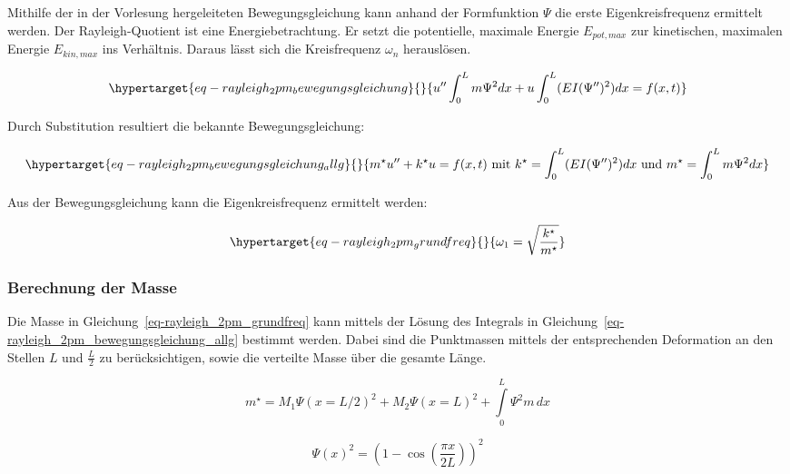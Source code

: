 \documentclass[
  letterpaper,
  DIV=11]{scrreprt}
\begin{document}
Mithilfe der in der Vorlesung hergeleiteten Bewegungsgleichung kann
anhand der Formfunktion \(\Psi\) die erste Eigenkreisfrequenz ermittelt
werden. Der Rayleigh-Quotient ist eine Energiebetrachtung. Er setzt die
potentielle, maximale Energie \(E_{pot,max}\) zur kinetischen, maximalen
Energie \(E_{kin,max}\) ins Verhältnis. Daraus lässt sich die
Kreisfrequenz \(\omega_n\) herauslösen.

\begin{equation}\protect\hypertarget{eq-rayleigh_2pm_bewegungsgleichung}{}{
u'' \int_0^L m\Psi^2 dx + u \int_0^L (EI(\Psi'')^2)dx = f(x,t)
}\label{eq-rayleigh_2pm_bewegungsgleichung}\end{equation}

Durch Substitution resultiert die bekannte Bewegungsgleichung:

\begin{equation}\protect\hypertarget{eq-rayleigh_2pm_bewegungsgleichung_allg}{}{
m^\star u'' + k^\star u  = f(x,t) 
\text{ mit } k^\star = \int_0^L (EI(\Psi'')^2)dx 
\text{ und } m^\star = \int_0^L m\Psi^2dx
}\label{eq-rayleigh_2pm_bewegungsgleichung_allg}\end{equation}

Aus der Bewegungsgleichung kann die Eigenkreisfrequenz ermittelt werden:

\begin{equation}\protect\hypertarget{eq-rayleigh_2pm_grundfreq}{}{
\omega_1 = \sqrt{\frac{k^\star}{m^\star}}
}\label{eq-rayleigh_2pm_grundfreq}\end{equation}

\hypertarget{berechnung-der-masse}{%
\subsubsection{Berechnung der Masse}\label{berechnung-der-masse}}

Die Masse in Gleichung~\ref{eq-rayleigh_2pm_grundfreq} kann mittels der
Lösung des Integrals in
Gleichung~\ref{eq-rayleigh_2pm_bewegungsgleichung_allg} bestimmt werden.
Dabei sind die Punktmassen mittels der entsprechenden Deformation an den
Stellen \(L\) und \(\frac{L}{2}\) zu berücksichtigen, sowie die
verteilte Masse über die gesamte Länge.

\begin{equation}m^{\star} = M_{1} \Psi(x=L/2)^{2} + M_{2} \Psi(x=L)^{2} + \int\limits_{0}^{L} \Psi^{2} m\, dx\end{equation}

\begin{equation}\Psi(x)^{2} = \left(1 - \cos{\left(\frac{\pi x}{2 L} \right)}\right)^{2}\end{equation}
\end{document}

